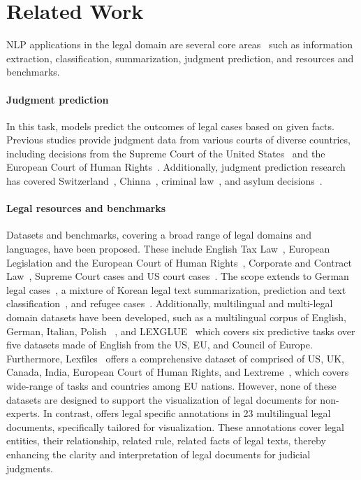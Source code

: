 \section{Related Work}
NLP applications in the legal domain are several core areas~\citep{Katz2023NaturalLP} such as information extraction, classification, summarization, judgment prediction, and resources and benchmarks.

\paragraph{Judgment prediction}
In this task, models predict the outcomes of legal cases based on given facts.
Previous studies provide judgment data from various courts of diverse countries, including decisions from the Supreme Court of the United States~\citep{10.1371/journal.pone.0174698} and the European Court of Human Rights~\citep{Medvedeva2020-MEDUML, Kaur2019ConvolutionalNN}.
Additionally, judgment prediction research has covered Switzerland~\citep{niklaus-etal-2021-swiss}, Chinna~\citep{ye-etal-2018-interpretable}, criminal law~\citep{chen-etal-2019-charge, Xiao2018CAIL2018AL}, and asylum decisions~\citep{10.1145/3086512.3086538, 10.1145/3086512.3086537}.

\paragraph{Legal resources and benchmarks} 
Datasets and benchmarks, covering a broad range of legal domains and languages, have been proposed.
These include English Tax Law~\citep{Holzenberger2020ADF}, European Legislation and the European Court of Human Rights~\citep{chalkidis-etal-2019-extreme}, Corporate and Contract Law~\citep{hendrycks2021cuad, tuggener-etal-2020-ledgar}, Supreme Court cases and US court cases~\citep{10.1145/3462757.3466088}.
The scope extends to German legal cases~\citep{icaart21}, a mixture of Korean legal text summarization, prediction and text classification~\citep{10.5555/3600270.3602628}, and refugee cases~\citep{barale-etal-2023-asylex}. 
Additionally, multilingual and multi-legal domain datasets have been developed, such as a multilingual corpus of English, German, Italian, Polish ~\citep{drawzeski-etal-2021-corpus},
and LEXGLUE~\citep{chalkidis-etal-2022-lexglue} which covers six predictive tasks over five datasets made of English from the US, EU, and Council of Europe.
Furthermore, Lexfiles~\citep{chalkidis-etal-2023-lexfiles} offers a comprehensive dataset of comprised of US, UK, Canada, India, European Court of Human Rights, and Lextreme~\citep{niklaus-etal-2023-lextreme}, which covers wide-range of tasks and countries among EU nations.
However, none of these datasets are designed to support the visualization of legal documents for non-experts.
In contrast, \datasetName offers legal specific annotations in 23 multilingual legal documents, specifically tailored for visualization.
These annotations cover legal entities, their relationship, related rule, related facts of legal texts, thereby enhancing the clarity and interpretation of legal documents for judicial judgments.

